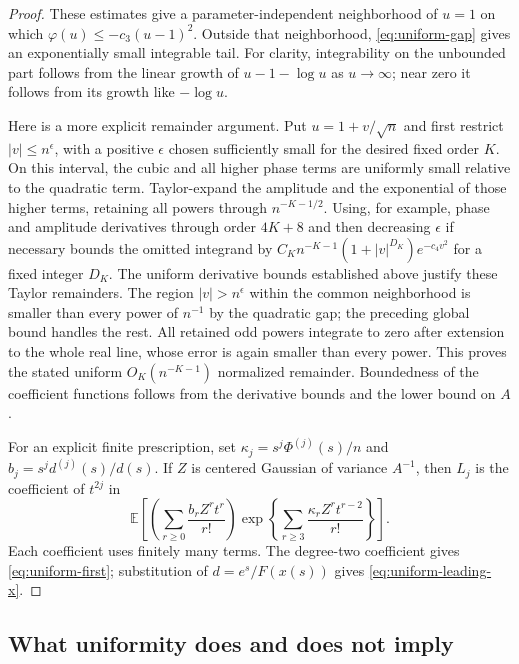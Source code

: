 \documentclass[11pt,letterpaper]{article}
\theoremstyle{definition}
\theoremstyle{remark}
\begin{document}
\begin{proof}
These estimates give a parameter-independent neighborhood of $u=1$
on which $\varphi(u)\le-c_3(u-1)^2$. Outside that neighborhood,
\eqref{eq:uniform-gap} gives an exponentially small integrable tail.
For clarity, integrability on the unbounded part follows from the linear
growth of $u-1-\log u$ as $u\to\infty$; near zero it follows from its
growth like $-\log u$.

Here is a more explicit remainder argument. Put $u=1+v/\sqrt n$ and
first restrict $|v|\le n^\epsilon$, with a positive $\epsilon$ chosen
sufficiently small for the desired fixed order $K$. On this interval,
the cubic and all higher phase terms are uniformly small relative to
the quadratic term. Taylor-expand the amplitude and the exponential
of those higher terms, retaining all powers through $n^{-K-1/2}$.
Using, for example, phase and amplitude derivatives through order
$4K+8$ and then decreasing $\epsilon$ if necessary bounds the omitted
integrand by $C_K n^{-K-1}(1+|v|^{D_K})e^{-c_4v^2}$ for a fixed
integer $D_K$. The uniform derivative bounds established above justify
these Taylor remainders. The region $|v|>n^\epsilon$ within the common
neighborhood is smaller than every power of $n^{-1}$ by the quadratic
gap; the preceding global bound handles the rest. All retained odd
powers integrate to zero after extension to the whole real line,
whose error is again smaller than every power. This proves the stated
uniform $O_K(n^{-K-1})$ normalized remainder. Boundedness of the
coefficient functions follows from the derivative bounds and the
lower bound on $A$.

For an explicit finite prescription, set
$\kappa_j=s^j\Phi^{(j)}(s)/n$ and
$b_j=s^j d^{(j)}(s)/d(s)$. If $Z$ is centered Gaussian of variance
$A^{-1}$, then $L_j$ is the coefficient of $t^{2j}$ in
\begin{equation}\label{eq:uniform-coefficient-rule}
 \mathbb E\left[
 \left(\sum_{r\ge0}\frac{b_r Z^r t^r}{r!}\right)
 \exp\left\{\sum_{r\ge3}\frac{\kappa_rZ^r t^{r-2}}{r!}\right\}
 \right].
\end{equation}
Each coefficient uses finitely many terms. The degree-two coefficient
gives \eqref{eq:uniform-first}; substitution of $d=e^s/F(x(s))$
gives \eqref{eq:uniform-leading-x}.
\end{proof}

\subsection{What uniformity does and does not imply}
\end{document}
